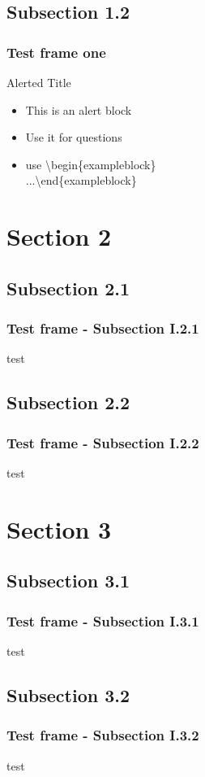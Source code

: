 \documentclass[10pt,compress]{beamer}
\begin{document}
\subsection{Subsection 1.2}
\begin{frame}\frametitle{Test frame one}
\begin{alertblock}{Alerted Title}
\begin{itemize}
 \item This is an alert block
 \item Use it for questions
\item use \textbackslash begin\{exampleblock\}\\ ...\textbackslash end\{exampleblock\}
\end{itemize}
\end{alertblock}
\end{frame}

\section{Section 2}
\subsection{Subsection 2.1}
\begin{frame}\frametitle{Test frame - Subsection I.2.1}test\end{frame}
\subsection{Subsection 2.2}
\begin{frame}\frametitle{Test frame - Subsection I.2.2}test\end{frame}

\section{Section 3}
\subsection{Subsection 3.1}
\begin{frame}\frametitle{Test frame - Subsection I.3.1}test\end{frame}
\subsection{Subsection 3.2}
\begin{frame}\frametitle{Test frame - Subsection I.3.2}test\end{frame}
\end{document}
